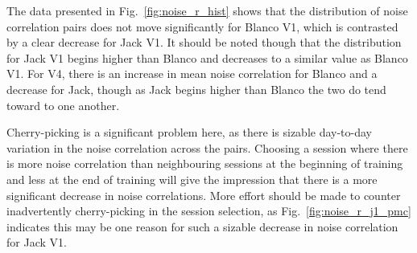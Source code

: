 The data presented in Fig.~\ref{fig:noise_r_hist} shows that the distribution of noise correlation pairs does not move significantly for Blanco V1, which is contrasted by a clear decrease for Jack V1. It should be noted though that the distribution for Jack V1 begins higher than Blanco and decreases to a similar value as Blanco V1. For V4, there is an increase in mean noise correlation for Blanco and a decrease for Jack, though as Jack begins higher than Blanco the two do tend toward to one another.

Cherry-picking is a significant problem here, as there is sizable day-to-day variation in the noise correlation across the pairs. Choosing a session where there is more noise correlation than neighbouring sessions at the beginning of training and less at the end of training will give the impression that there is a more significant decrease in noise correlations. More effort should be made to counter inadvertently cherry-picking in the session selection, as Fig.~\ref{fig:noise_r_j1_pmc} indicates this may be one reason for such a sizable decrease in noise correlation for Jack V1.

